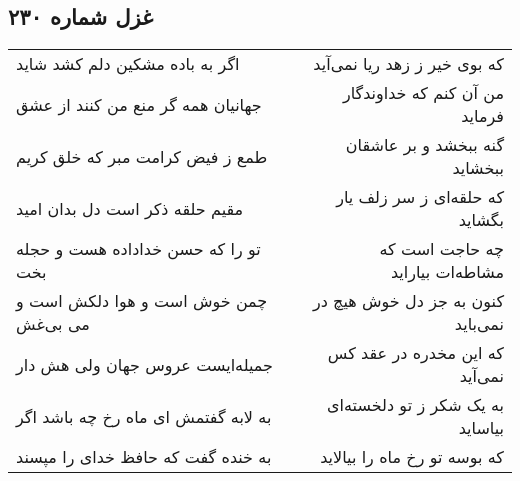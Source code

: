 \begin{center}
\section*{غزل شماره ۲۳۰}
\label{sec:sh230}
\begin{longtable}{l p{0.5cm} r}
اگر به باده مشکین دلم کشد شاید
&&
که بوی خیر ز زهد ریا نمی‌آید
\\
جهانیان همه گر منع من کنند از عشق
&&
من آن کنم که خداوندگار فرماید
\\
طمع ز فیض کرامت مبر که خلق کریم
&&
گنه ببخشد و بر عاشقان ببخشاید
\\
مقیم حلقه ذکر است دل بدان امید
&&
که حلقه‌ای ز سر زلف یار بگشاید
\\
تو را که حسن خداداده هست و حجله بخت
&&
چه حاجت است که مشاطه‌ات بیاراید
\\
چمن خوش است و هوا دلکش است و می بی‌غش
&&
کنون به جز دل خوش هیچ در نمی‌باید
\\
جمیله‌ایست عروس جهان ولی هش دار
&&
که این مخدره در عقد کس نمی‌آید
\\
به لابه گفتمش ای ماه رخ چه باشد اگر
&&
به یک شکر ز تو دلخسته‌ای بیاساید
\\
به خنده گفت که حافظ خدای را مپسند
&&
که بوسه تو رخ ماه را بیالاید
\\
\end{longtable}
\end{center}
